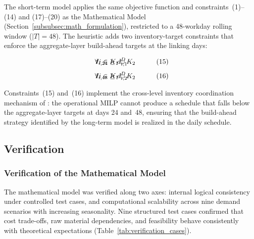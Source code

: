 \documentclass[11pt]{article}
\begin{document}
The short-term model applies the same objective function and constraints~(1)--(14) and (17)--(20) as the Mathematical Model (Section~\ref{subsubsec:math_formulation}), restricted to a 48-workday rolling window ($|T|=48$). The heuristic adds two inventory-target constraints that enforce the aggregate-layer build-ahead targets at the linking days:

\begin{alignat}{4}
&&& I_{i,24} \geq d_{i,1}^D && \hspace{-2cm} \forall i\in K_1 \cup K_2 &&\tag{15}\\[4pt]
&&& I_{i,48} \geq d_{i,2}^D && \hspace{-2cm} \forall i\in K_1 \cup K_2 &&\tag{16}
\end{alignat}

Constraints~(15) and~(16) implement the cross-level inventory coordination mechanism of \cite{suerie2003clspl}: the operational MILP cannot produce a schedule that falls below the aggregate-layer targets at days 24 and~48, ensuring that the build-ahead strategy identified by the long-term model is realized in the daily schedule.


\subsection{Verification}
\subsubsection{Verification of the Mathematical Model}

The mathematical model was verified along two axes: internal logical consistency under controlled test cases, and computational scalability across nine demand scenarios with increasing seasonality. Nine structured test cases confirmed that cost trade-offs, raw material dependencies, and feasibility behave consistently with theoretical expectations (Table~\ref{tab:verification_cases}).
\end{document}
